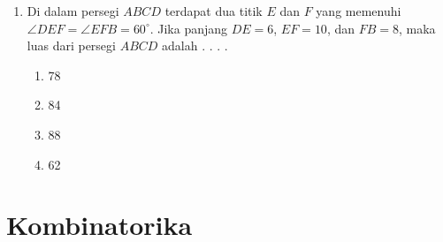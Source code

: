 \documentclass[12pt]{scrartcl}
\begin{document}
\begin{enumerate}[label={Soal \arabic*}]
    \item Di dalam persegi $ABCD$ terdapat dua titik $E$ dan $F$ yang memenuhi $\angle DEF=\angle EFB=60^\circ$. Jika panjang $DE=6$, $EF=10$, dan $FB=8$, maka luas dari persegi $ABCD$ adalah . . . .
    \begin{enumerate}[label={(\Alph*)}]
        \item 78 \item 84 \item 88 \item 62
    \end{enumerate}
\end{enumerate}

\section*{Kombinatorika}
\end{document}
